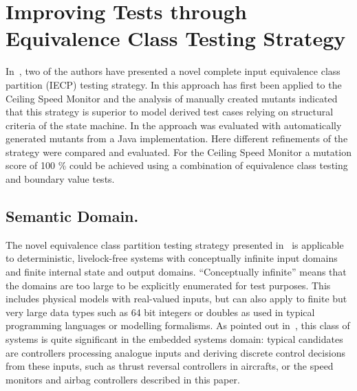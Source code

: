 \newcommand{\q}{\textbf{q}}

\section{Improving Tests through Equivalence Class Testing Strategy}\label{sec:ecpt}
\label{sec:ecpt}

 In~\cite{peleska_sttt_2014}, two of the authors have presented a novel complete 
input equivalence class partition (IECP) testing strategy. In \cite{peleska_csm_2014}
this approach has first been applied to the Ceiling Speed Monitor and the analysis of
manually created mutants indicated that this strategy is superior to model derived test cases relying on
structural criteria of the state machine. In \cite{huebner15} the approach was evaluated 
with automatically generated mutants from a Java implementation. Here different refinements of
the strategy were compared and evaluated. For the Ceiling Speed Monitor a mutation score of 100 \%
could be achieved using a combination of equivalence class testing and boundary value tests.  




\subsection{Semantic Domain.} 

The novel equivalence class partition testing strategy presented 
in~\cite{peleska_sttt_2014} is applicable to deterministic, livelock-free systems 
with conceptually infinite input domains and finite internal state and output domains.
``Conceptually infinite'' means that the domains are too large to be explicitly 
enumerated for test purposes. This includes physical models with real-valued inputs,
but can also apply to finite but very large data types such as 64 bit integers or
doubles as used in typical programming languages or modelling formalisms. As pointed out 
in~\cite{peleska_sttt_2014,peleska_csm_2014}, this class of systems is quite
significant in the embedded systems domain: typical candidates are controllers 
processing analogue inputs and deriving discrete control decisions from these inputs, such
as thrust reversal controllers in aircrafts, or the speed monitors and airbag controllers described
in this paper.

